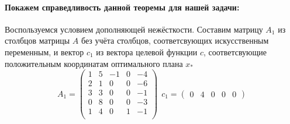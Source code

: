\documentclass{article}
\begin{document}
	
\paragraph{Покажем справедливость данной теоремы для нашей задачи:} \label{show}
Воспользуемся условием дополняющей нежёсткости. Составим матрицу $A_1$ из столбцов матрицы $A$ без учёта столбцов, соответсвующих искусственным переменным, и вектор $c_1$ из вектора целевой функции $c$, соответсвующие положительным координатам оптимального плана $x_{*}$
\begin{equation*}
    A_1=
    \begin{pmatrix}
    1 & 5 & -1 & 0 & -4\\
    2 & 1 & 0 & 0 & -6\\
    3 & 3 & 0 & 0 & -1\\
    0 & 8 & 0 & 0 & -3\\
    1 & 4 & 0 & 1 & -1\\
    \end{pmatrix}
    ~~
    c_1=
    \begin{pmatrix}
    0 & 4 & 0 & 0 & 0 
    \end{pmatrix}
\end{equation*}
\end{document}
